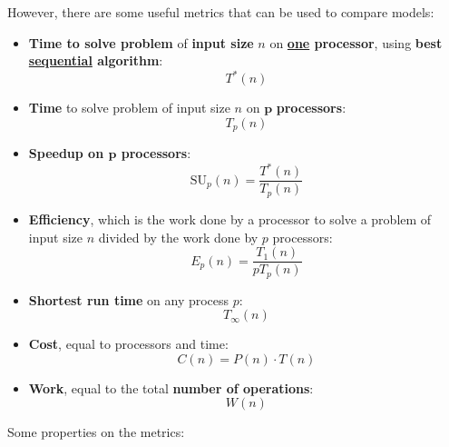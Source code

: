 \highspace
However, there are some useful metrics that can be used to compare models:
\begin{itemize}
    \item \textbf{Time to solve problem} of \textbf{input size} $n$ on \textbf{\underline{one} processor}, using \textbf{best \underline{sequential} algorithm}:
    \begin{equation}
        T^{*}\left(n\right)
    \end{equation}

    \item \textbf{Time} to solve problem of input size $n$ on \underline{$\mathbf{p}$} \textbf{processors}:
    \begin{equation}
        T_{p}\left(n\right)
    \end{equation}

    \item \textbf{Speedup on $\mathbf{p}$ processors}:
    \begin{equation}
        \mathrm{SU}_{p}\left(n\right) = \dfrac{T^{*}\left(n\right)}{T_{p}\left(n\right)}
    \end{equation}

    \item \textbf{Efficiency}, which is the work done by a processor to solve a problem of input size $n$ divided by the work done by $p$ processors:
    \begin{equation}
        E_{p}\left(n\right) = \dfrac{T_{1}\left(n\right)}{pT_{p}\left(n\right)}
    \end{equation}

    \item \textbf{Shortest run time} on any process $p$:
    \begin{equation}
        T_{\infty}\left(n\right)
    \end{equation}

    \item \textbf{Cost}, equal to processors and time:
    \begin{equation}
        C\left(n\right) = P\left(n\right) \cdot T\left(n\right)
    \end{equation}

    \item \textbf{Work}, equal to the total \textbf{number of operations}:
    \begin{equation}
        W\left(n\right)
    \end{equation}
\end{itemize}
Some properties on the metrics:
